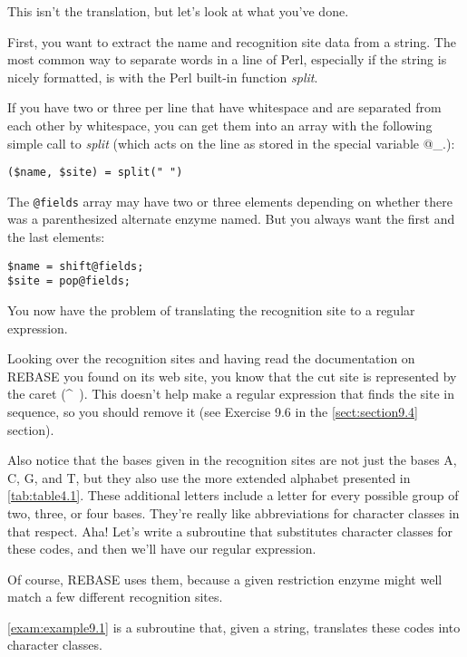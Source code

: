 This isn't the translation, but let's look at what you've done.

First, you want to extract the name and recognition site data from a string. The most common way to separate words in a line of Perl, especially if the string is nicely formatted, is with the Perl built-in function \textit{split}.

If you have two or three per line that have whitespace and are separated from each other by whitespace, you can get them into an array with the following simple call to \textit{split} (which acts on the line as stored in the special variable @\_.):

\begin{lstlisting}
($name, $site) = split(" ")
\end{lstlisting}

The \verb|@fields| array may have two or three elements depending on whether there was a parenthesized alternate enzyme named. But you always want the first and the last elements: 

\begin{lstlisting}
$name = shift@fields;
$site = pop@fields;
\end{lstlisting}

You now have the problem of translating the recognition site to a regular expression.

Looking over the recognition sites and having read the documentation on REBASE you found on its web site, you know that the cut site is represented by the caret (\^~). This doesn't help make a regular expression that finds the site in sequence, so you should remove it (see Exercise 9.6 in the \autoref{sect:section9.4} section).

Also notice that the bases given in the recognition sites are not just the bases A, C, G, and T, but they also use the more extended alphabet presented in \autoref{tab:table4.1}. These additional letters include a letter for every possible group of two, three, or four bases. They're really like abbreviations for character classes in that respect. Aha! Let's write a subroutine that substitutes character classes for these codes, and then we'll have our regular expression.

Of course, REBASE uses them, because a given restriction enzyme might well match a few different recognition sites.

\autoref{exam:example9.1} is a subroutine that, given a string, translates these codes into character classes. 



